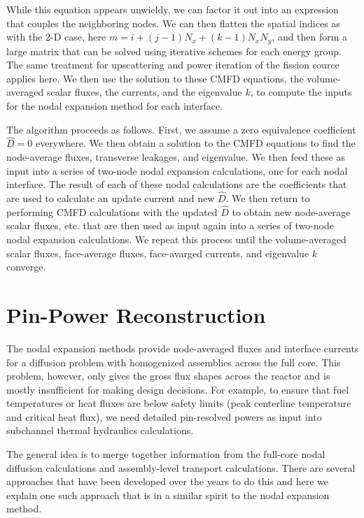 While this equation appears unwieldy, we can factor it out into an expression that couples the neighboring nodes. We can then flatten the spatial indices as with the 2-D case, here $m = i + (j-1) N_x + (k-1) N_x N_y$, and then form a large matrix that can be solved using iterative schemes for each energy group. The same treatment for upscattering and power iteration of the fission source applies here. We then use the solution to these CMFD equations, the volume-averaged scalar fluxes, the currents, and the eigenvalue $k$, to compute the inputs for the nodal expansion method for each interface.

The algorithm proceeds as follows. First, we assume a zero equivalence coefficient $\widehat{D} = 0$ everywhere. We then obtain a solution to the CMFD equations to find the node-average fluxes, transverse leakages, and eigenvalue. We then feed these as input into a series of two-node nodal expansion calculations, one for each nodal interface. The result of each of these nodal calculations are the coefficients that are used to calculate an update current and new $\widehat{D}$. We then return to performing CMFD calculations with the updated $\widehat{D}$ to obtain new node-average scalar fluxes, etc. that are then used as input again into a series of two-node nodal expansion calculations. We repeat this process until the volume-averaged scalar fluxes, face-average fluxes, face-avarged currents, and eigenvalue $k$ converge.





\section{Pin-Power Reconstruction}

The nodal expansion methods provide node-averaged fluxes and interface currents for a diffusion problem with homogenized assemblies across the full core. This problem, however, only gives the gross flux shapes across the reactor and is mostly insufficient for making design decisions. For example, to ensure that fuel temperatures or heat fluxes are below safety limits (peak centerline temperature and critical heat flux), we need detailed pin-resolved powers as input into subchannel thermal hydraulics calculations.

The general idea is to merge together information from the full-core nodal diffusion calculations and assembly-level transport calculations. There are several approaches that have been developed over the years to do this and here we explain one such approach that is in a similar spirit to the nodal expansion method.


